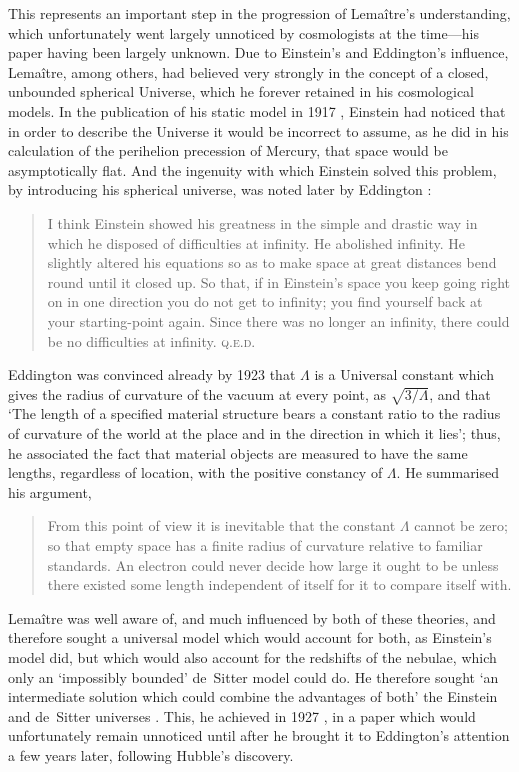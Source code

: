 This represents an important step in the progression of Lema\^{i}tre's understanding, which unfortunately went largely unnoticed by cosmologists at the time---his paper having been largely unknown. Due to Einstein's and Eddington's influence, Lema\^{i}tre, among others, had believed very strongly in the concept of a closed, unbounded spherical Universe, which he forever retained in his cosmological models. In the publication of his static model in 1917 \cite{Einstein1917}, Einstein had noticed that in order to describe the Universe it would be incorrect to assume, as he did in his calculation of the perihelion precession of Mercury, that space would be asymptotically flat. And the ingenuity with which Einstein solved this problem, by introducing his spherical universe, was noted later by Eddington \cite{Eddington1933}:
\begin{quotation}
I think Einstein showed his greatness in the simple and drastic way in which he disposed of difficulties at infinity. He abolished infinity. He slightly altered his equations so as to make space at great distances bend round until it closed up. So that, if in Einstein's space you keep going right on in one direction you do not get to infinity; you find yourself back at your starting-point again. Since there was no longer an infinity, there could be no difficulties at infinity. \textsc{q.e.d.}
\end{quotation}
Eddington was convinced already by 1923 \cite{Eddington1923} that $\Lambda$ is a Universal constant which gives the radius of curvature of the vacuum at every point, as $\sqrt{3/\Lambda}$, and that `The length of a specified material structure bears a constant ratio to the radius of curvature of the world at the place and in the direction in which it lies'; thus, he associated the fact that material objects are measured to have the same lengths, regardless of location, with the positive constancy of $\Lambda$. He summarised his argument,
\begin{quotation}
From this point of view it is inevitable that the constant $\Lambda$ cannot be zero; so that empty space has a finite radius of curvature relative to familiar standards. An electron could never decide how large it ought to be unless there existed some length independent of itself for it to compare itself with.
\end{quotation}
Lema\^{i}tre was well aware of, and much influenced by both of these theories, and therefore sought a universal model which would account for both, as Einstein's model did, but which would also account for the redshifts of the nebulae, which only an `impossibly bounded' de~Sitter model could do. He therefore sought `an intermediate solution which could combine the advantages of both' the Einstein and de~Sitter universes \cite{Lemaitre1931a}. This, he achieved in 1927 \cite{Lemaitre1927}, in a paper which would unfortunately remain unnoticed until after he brought it to Eddington's attention a few years later, following Hubble's discovery.

